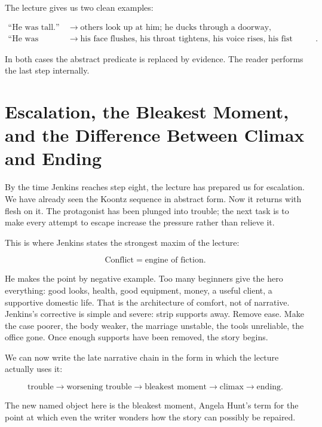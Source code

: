 The lecture gives us two clean examples:

\begin{align}
\text{``He was tall.''} &\to \text{others look up at him; he ducks through a doorway},\\
\text{``He was angry.''} &\to \text{his face flushes, his throat tightens, his voice rises, his fist strikes the table}.
\end{align}

In both cases the abstract predicate is replaced by evidence. The reader performs the last step internally.

\section{Escalation, the Bleakest Moment, and the Difference Between Climax and Ending}

By the time Jenkins reaches step eight, the lecture has prepared us for escalation. We have already seen the Koontz sequence in abstract form. Now it returns with flesh on it. The protagonist has been plunged into trouble; the next task is to make every attempt to escape increase the pressure rather than relieve it.

This is where Jenkins states the strongest maxim of the lecture:

\begin{equation}
\text{Conflict}=\text{engine of fiction}.
\end{equation}

He makes the point by negative example. Too many beginners give the hero everything: good looks, health, good equipment, money, a useful client, a supportive domestic life. That is the architecture of comfort, not of narrative. Jenkins's corrective is simple and severe: strip supports away. Remove ease. Make the case poorer, the body weaker, the marriage unstable, the tools unreliable, the office gone. Once enough supports have been removed, the story begins.

We can now write the late narrative chain in the form in which the lecture actually uses it:

\begin{equation}
\text{trouble} \to \text{worsening trouble} \to \text{bleakest moment} \to \text{climax} \to \text{ending}.
\end{equation}

The new named object here is the bleakest moment, Angela Hunt's term for the point at which even the writer wonders how the story can possibly be repaired.

